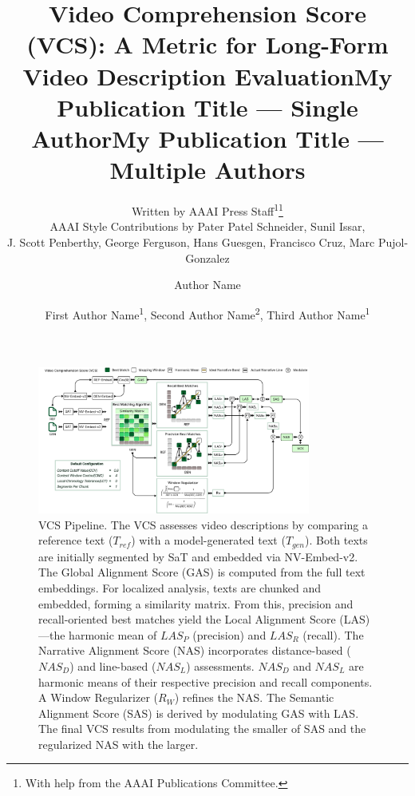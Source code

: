 \documentclass[letterpaper]{article} %
\title{Video Comprehension Score (VCS): A Metric for Long-Form Video Description Evaluation}
\author{
    Written by AAAI Press Staff\textsuperscript{\rm 1}\thanks{With help from the AAAI Publications Committee.}\\
    AAAI Style Contributions by Pater Patel Schneider,
    Sunil Issar,\\
    J. Scott Penberthy,
    George Ferguson,
    Hans Guesgen,
    Francisco Cruz\equalcontrib,
    Marc Pujol-Gonzalez\equalcontrib
}
\title{My Publication Title --- Single Author}
\author {
    Author Name
}
\title{My Publication Title --- Multiple Authors}
\author {
    First Author Name\textsuperscript{\rm 1},
    Second Author Name\textsuperscript{\rm 2},
    Third Author Name\textsuperscript{\rm 1}
}
\begin{document}
\maketitle

\begin{figure}[t]
\centering
\includegraphics[width=0.8\textwidth]{VCS.pdf}
\caption{VCS Pipeline. The VCS assesses video descriptions by comparing a reference text ($T_{ref}$) with a model-generated text ($T_{gen}$). Both texts are initially segmented by SaT and embedded via NV-Embed-v2. The Global Alignment Score (GAS) is computed from the full text embeddings. For localized analysis, texts are chunked and embedded, forming a similarity matrix. From this, precision and recall-oriented best matches yield the Local Alignment Score (LAS)—the harmonic mean of $LAS_P$ (precision) and $LAS_R$ (recall). The Narrative Alignment Score (NAS) incorporates distance-based ($NAS_D$) and line-based ($NAS_L$) assessments. $NAS_D$ and $NAS_L$ are harmonic means of their respective precision and recall components. A Window Regularizer ($R_W$) refines the NAS. The Semantic Alignment Score (SAS) is derived by modulating GAS with LAS. The final VCS results from modulating the smaller of SAS and the regularized NAS with the larger.}
\label{fig:vcs-architecture}
\end{figure}
\end{document}
